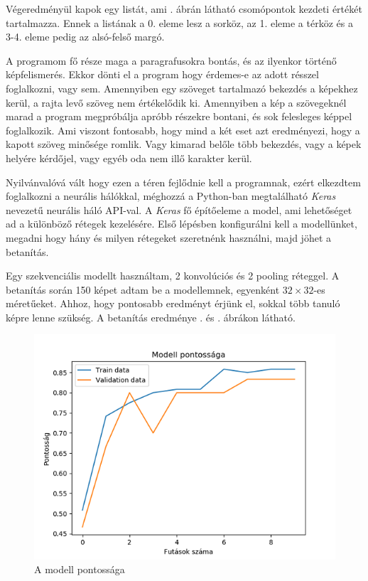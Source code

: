 Végeredményül kapok egy listát, ami . ábrán látható csomópontok kezdeti értékét tartalmazza. Ennek a listának a 0. eleme lesz a sorköz, az 1. eleme a térköz és a 3-4. eleme pedig az alsó-felső margó.


A programom fő része maga a paragrafusokra bontás, és az ilyenkor történő képfelismerés. Ekkor dönti el a program hogy érdemes-e az adott résszel foglalkozni, vagy sem. Amennyiben egy szöveget tartalmazó bekezdés a képekhez kerül, a rajta levő szöveg nem értékelődik ki. Amennyiben a kép a szövegeknél marad a program megpróbálja apróbb részekre bontani, és sok felesleges képpel foglalkozik. Ami viszont fontosabb, hogy mind a két eset azt eredményezi, hogy a kapott szöveg minősége romlik. Vagy kimarad belőle több bekezdés, vagy a képek helyére kérdőjel, vagy egyéb oda nem illő karakter kerül.

Nyilvánvalóvá vált hogy ezen a téren fejlődnie kell a programnak, ezért elkezdtem foglalkozni a neurális hálókkal, méghozzá a Python-ban megtalálható \textit{Keras} nevezetű neurális háló API-val.
A \textit{Keras} fő építőeleme a model, ami lehetőséget ad a különböző rétegek kezelésére. Első lépésben konfigurálni kell a modellünket, megadni hogy hány és milyen rétegeket szeretnénk használni, majd jöhet a betanítás.

Egy szekvenciális modellt használtam, 2 konvolúciós és 2 pooling réteggel. A betanítás során 150 képet adtam be a modellemnek, egyenként $32\times32$-es méretűeket. Ahhoz, hogy pontosabb eredményt érjünk el, sokkal több tanuló képre lenne szükség. A betanítás eredménye . és . ábrákon látható.

\begin{figure}[h!]
\centering
\includegraphics[scale=1]{images/accuracy.png}
\caption{A modell pontossága}
\label{fig:accuracy}
\end{figure}

